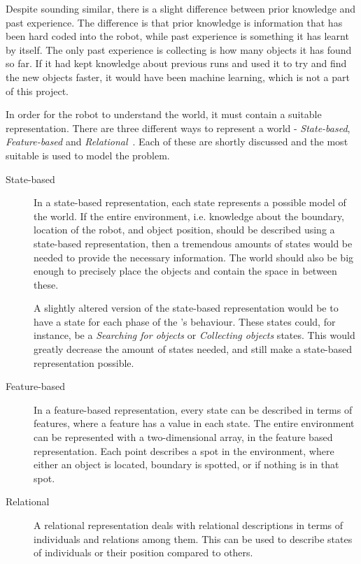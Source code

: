 Despite sounding similar, there is a slight difference between prior knowledge and past experience. The difference is that prior knowledge is information that has been hard coded into the robot, while past experience is something it has learnt by itself. The only past experience \projname{} is collecting is how many objects it has found so far. If it had kept knowledge about previous runs and used it to try and find the new objects faster, it would have been machine learning, which is not a part of this project.

In order for the robot to understand the world, it must contain a suitable representation. There are three different ways to represent a world - \emph{State-based}, \emph{Feature-based} and \emph{Relational}~\citep{artificialintelligencebook}. Each of these are shortly discussed and the most suitable is used to model the problem. 

\begin{description}
\item[State-based] In a state-based representation, each state represents a possible model of the world. If the entire environment, i.e. knowledge about the boundary, location of the robot, and object position, should be described using a state-based representation, then a  tremendous amounts of states would be needed to provide the necessary information. The world should also be big enough to precisely place the objects and contain the space in between these. 

A slightly altered version of the state-based representation would be to have a state for each phase of the \projname{}'s behaviour. These states could, for instance, be a \emph{Searching for objects} or \emph{Collecting objects} states. This would greatly decrease the amount of states needed, and still make a state-based representation possible. 

\item[Feature-based] In a feature-based representation, every state can be described in terms of features, where a feature has a value in each state. The entire environment can be represented with a two-dimensional array, in the feature based representation. Each point describes a spot in the environment, where either an object is located, boundary is spotted, or if nothing is in that spot. 

\item[Relational] A relational representation deals with relational descriptions in terms of individuals and relations among them. This can be used to describe states of individuals or their position compared to others. 
\end{description}

